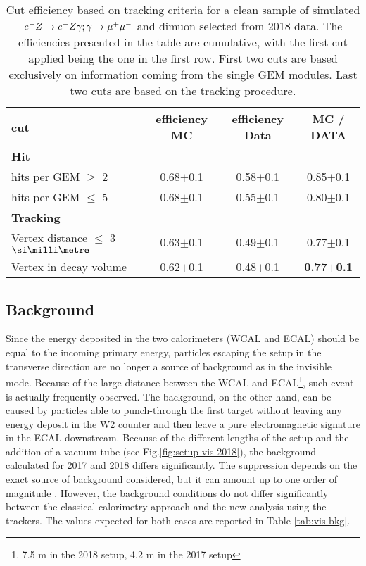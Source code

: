 \begin{center}
\begin{table}
  \begin{tabular}{|l|c|c|c|}
    \hline
    cut & efficiency MC & efficiency Data & MC / DATA \\
    \hline
    \multicolumn{4}{|l|}{\textbf{Hit}}\\
    \hline
    hits per GEM $\geq$ 2 & 0.68$\pm$0.1 & 0.58$\pm$0.1 & 0.85$\pm$0.1 \\
    hits per GEM $\leq$ 5 & 0.68$\pm$0.1 & 0.55$\pm$0.1 & 0.80$\pm$0.1 \\
    \hline
    \multicolumn{4}{|l|}{\textbf{Tracking}}\\    
    \hline
    Vertex distance $\leq$ 3 $\mmi$ & 0.63$\pm$0.1 & 0.49$\pm$0.1 & 0.77$\pm$0.1  \\
    Vertex in decay volume & 0.62$\pm$0.1 & 0.48$\pm$0.1 & \textbf{0.77$\pm$0.1}\\
    \hline
    
  \end{tabular}
  \caption[MC/DATA for the tracking procedure and vertex reconstruction]{Cut efficiency based on tracking criteria for a clean sample of simulated $e^- Z \to e^- Z \gamma; \gamma \to \mu^+ \mu^-$ and dimuon selected from 2018 data. The efficiencies presented in the table are cumulative, with the first cut applied being the one in the first row. First two cuts are based exclusively on information coming from the single GEM modules. Last two cuts are based on the tracking procedure.}
  \label{tab:dimuon:efficiencies}
\end{table}
\end{center}

\subsection{Background}
\label{ch3:sec:bkg:vis}

Since the energy deposited in the two calorimeters (WCAL and ECAL) should be equal to the incoming primary energy, particles escaping the setup in the transverse direction are no longer a source of background as in the invisible mode. Because of the large distance between the WCAL and ECAL\footnote{7.5 \si{\meter} in the 2018 setup, 4.2 \si{\meter} in the 2017 setup}, such event is actually frequently observed. The background, on the other hand, can be caused by particles able to punch-through the first target without leaving any energy deposit in the W2 counter and then leave a pure electromagnetic signature in the ECAL downstream. Because of the different lengths of the setup and the addition of a vacuum tube (see Fig.\ref{fig:setup-vis-2018}), the background calculated for 2017 and 2018 differs significantly. The suppression depends on the exact source of background considered, but it can amount up to one order of magnitude \cite{Banerjee:2019hmi}. However, the background conditions do not differ significantly between the classical calorimetry approach and the new analysis using the trackers. The values expected for both cases are reported in Table \ref{tab:vis-bkg}.


